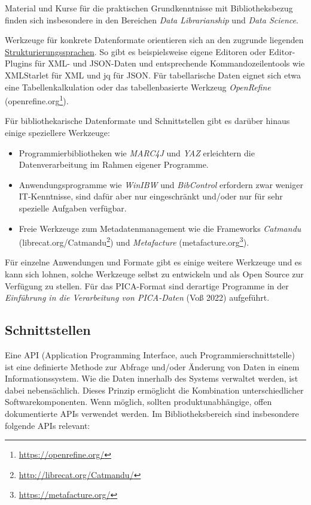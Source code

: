 \documentclass[
  11pt,
  letterpaper,
  DIV=11,
  twoside]{scrreprt}
\DeclareRobustCommand{\href}[2]{#2\footnote{\url{#1}}}
\begin{document}
Material und Kurse für die praktischen Grundkenntnisse mit
Bibliotheksbezug finden sich insbesondere in den Bereichen \emph{Data
Librarianship} und \emph{Data Science}.

Werkzeuge für konkrete Datenformate orientieren sich an den zugrunde
liegenden \hyperref[daten]{Strukturierungssprachen}. So gibt es
beispielsweise eigene Editoren oder Editor-Plugins für XML- und
JSON-Daten und entsprechende Kommandozeilentools wie XMLStarlet für XML
und jq für JSON. Für tabellarische Daten eignet sich etwa eine
Tabellenkalkulation oder das tabellenbasierte Werkzeug \emph{OpenRefine}
(\href{https://openrefine.org/}{openrefine.org}).

Für bibliothekarische Datenformate und Schnittstellen gibt es darüber
hinaus einige speziellere Werkzeuge:

\begin{itemize}
\item
  Programmierbibliotheken wie \emph{MARC4J} und \emph{YAZ} erleichtern
  die Datenverarbeitung im Rahmen eigener Programme.
\item
  Anwendungsprogramme wie \emph{WinIBW} und \emph{BibControl} erfordern
  zwar weniger IT-Kenntnisse, sind dafür aber nur eingeschränkt und/oder
  nur für sehr spezielle Aufgaben verfügbar.
\item
  Freie Werkzeuge zum Metadatenmanagement wie die Frameworks
  \emph{Catmandu}
  (\href{http://librecat.org/Catmandu/}{librecat.org/Catmandu}) und
  \emph{Metafacture} (\href{https://metafacture.org/}{metafacture.org}).
\end{itemize}

Für einzelne Anwendungen und Formate gibt es einige weitere Werkzeuge
und es kann sich lohnen, solche Werkzeuge selbst zu entwickeln und als
Open Source zur Verfügung zu stellen. Für das PICA-Format sind derartige
Programme in der \emph{Einführung in die Verarbeitung von PICA-Daten}
(Voß 2022) aufgeführt.

\subsection{Schnittstellen}\label{schnittstellen}

Eine API (Application Programming Interface, auch
Programmierschnittstelle) ist eine definierte Methode zur Abfrage
und/oder Änderung von Daten in einem Informationssystem. Wie die Daten
innerhalb des Systems verwaltet werden, ist dabei nebensächlich. Dieses
Prinzip ermöglicht die Kombination unterschiedlicher
Softwarekomponenten. Wenn möglich, sollten produktunabhängige, offen
dokumentierte APIs verwendet werden. Im Bibliotheksbereich sind
insbesondere folgende APIs relevant:
\end{document}
